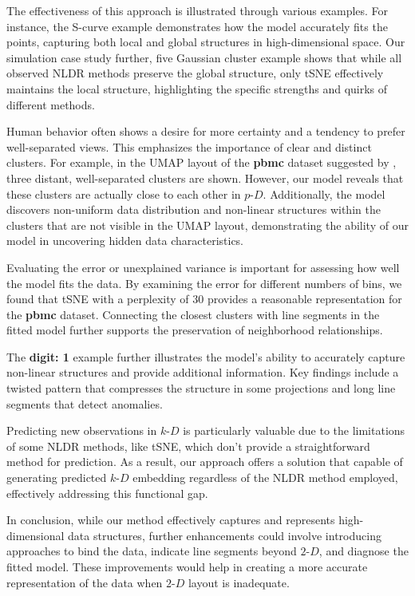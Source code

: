 \documentclass[
  12pt]{article}
\newcommand\pD{$p\text{-}D$}
\newcommand\kD{$k\text{-}D$}
\newcommand\gD{$2\text{-}D$}
\begin{document}
The effectiveness of this approach is illustrated through various
examples. For instance, the S-curve example demonstrates how the model
accurately fits the points, capturing both local and global structures
in high-dimensional space. Our simulation case study further, five
Gaussian cluster example shows that while all observed NLDR methods
preserve the global structure, only tSNE effectively maintains the local
structure, highlighting the specific strengths and quirks of different
methods.

Human behavior often shows a desire for more certainty and a tendency to
prefer well-separated views. This emphasizes the importance of clear and
distinct clusters. For example, in the UMAP layout of the \textbf{pbmc}
dataset suggested by \citet{chen2023}, three distant, well-separated
clusters are shown. However, our model reveals that these clusters are
actually close to each other in \pD{}. Additionally, the model discovers
non-uniform data distribution and non-linear structures within the
clusters that are not visible in the UMAP layout, demonstrating the
ability of our model in uncovering hidden data characteristics.

Evaluating the error or unexplained variance is important for assessing
how well the model fits the data. By examining the error for different
numbers of bins, we found that tSNE with a perplexity of \(30\) provides
a reasonable representation for the \textbf{pbmc} dataset. Connecting
the closest clusters with line segments in the fitted model further
supports the preservation of neighborhood relationships.

The \textbf{digit: 1} example further illustrates the model's ability to
accurately capture non-linear structures and provide additional
information. Key findings include a twisted pattern that compresses the
structure in some projections and long line segments that detect
anomalies.

Predicting new observations in \kD{} is particularly valuable due to the
limitations of some NLDR methods, like tSNE, which don't provide a
straightforward method for prediction. As a result, our approach offers
a solution that capable of generating predicted \kD{} embedding
regardless of the NLDR method employed, effectively addressing this
functional gap.

In conclusion, while our method effectively captures and represents
high-dimensional data structures, further enhancements could involve
introducing approaches to bind the data, indicate line segments beyond
\gD{}, and diagnose the fitted model. These improvements would help in
creating a more accurate representation of the data when \gD{} layout is
inadequate.
\end{document}
